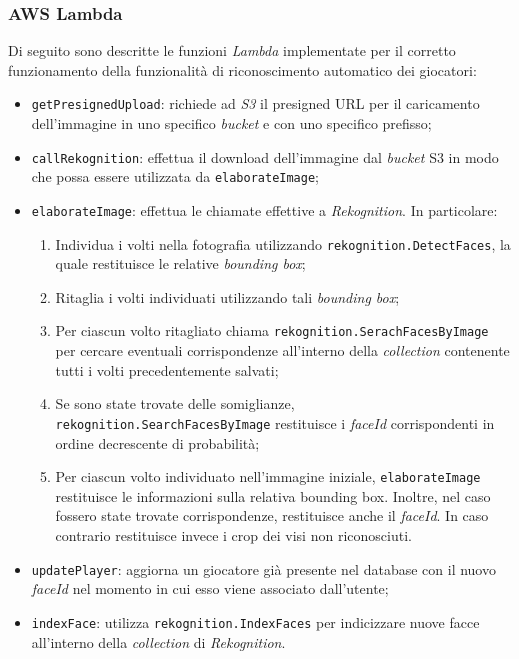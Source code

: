 	\subsubsection{AWS Lambda}
	Di seguito sono descritte le funzioni \emph{Lambda} implementate per il corretto funzionamento della funzionalità di riconoscimento automatico dei giocatori:
	\begin{itemize}
		\item \texttt{getPresignedUpload}: richiede ad \emph{S3} il presigned URL per il caricamento dell'immagine in uno specifico \emph{bucket} e con uno specifico prefisso;
		\item \texttt{callRekognition}: effettua il download dell'immagine dal \emph{bucket} S3 in modo che possa essere utilizzata da \texttt{elaborateImage};
		\item \texttt{elaborateImage}: effettua le chiamate effettive a \emph{Rekognition}. In particolare:
			\begin{enumerate}
				\item Individua i volti nella fotografia utilizzando \texttt{rekognition.DetectFaces}, la quale restituisce le relative \emph{bounding box};
				\item Ritaglia i volti individuati utilizzando tali \emph{bounding box};
				\item Per ciascun volto ritagliato chiama \texttt{rekognition.SerachFacesByImage} per cercare eventuali corrispondenze all'interno della \emph{collection} contenente tutti i volti precedentemente salvati;
				\item Se sono state trovate delle somiglianze, \texttt{rekognition.SearchFacesByImage} restituisce i \emph{faceId} corrispondenti in ordine decrescente di probabilità;
				\item Per ciascun volto individuato nell'immagine iniziale, \texttt{elaborateImage} restituisce le informazioni sulla relativa bounding box. Inoltre, nel caso fossero state trovate corrispondenze, restituisce anche il \emph{faceId}. In caso contrario restituisce invece i crop dei visi non riconosciuti.
			\end{enumerate}
		\item \texttt{updatePlayer}: aggiorna un giocatore già presente nel database con il nuovo \emph{faceId} nel momento in cui esso viene associato dall'utente;
		\item \texttt{indexFace}: utilizza \texttt{rekognition.IndexFaces} per indicizzare nuove facce all'interno della \emph{collection} di \emph{Rekognition}.
	\end{itemize}
	
